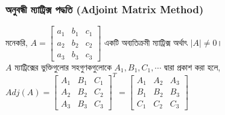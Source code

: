 \subsubsection{অনুবন্ধী ম্যাট্রিক্স পদ্ধতি (Adjoint Matrix Method)}
মনেকরি, $A=\left[\begin{array}{ccc}
a_1 & b_1 & c_1 \\
a_2 & b_2 & c_2 \\
a_3 & b_3 & c_3
\end{array}\right]$ একটি অব্যতিক্রমী ম্যাট্রিক্স অর্থাৎ $|A|\neq 0$।\\
$A$ ম্যাট্রিক্সের ভুক্তিগুলোর সহগুণকগুলোকে $A_1,B_1,C_1,\cdots$ দ্বারা প্রকাশ করা হলে,\\ 
$Adj(A)=\left[\begin{array}{ccc}
A_1 & B_1 & C_1 \\
A_2 & B_2 & C_2 \\
A_3 & B_3 & C_3
\end{array}\right]^T=\left[\begin{array}{ccc}
A_1 & A_2 & A_3 \\
B_1 & B_2 & B_3 \\
C_1 & C_2 & C_3
\end{array}\right]$\\
